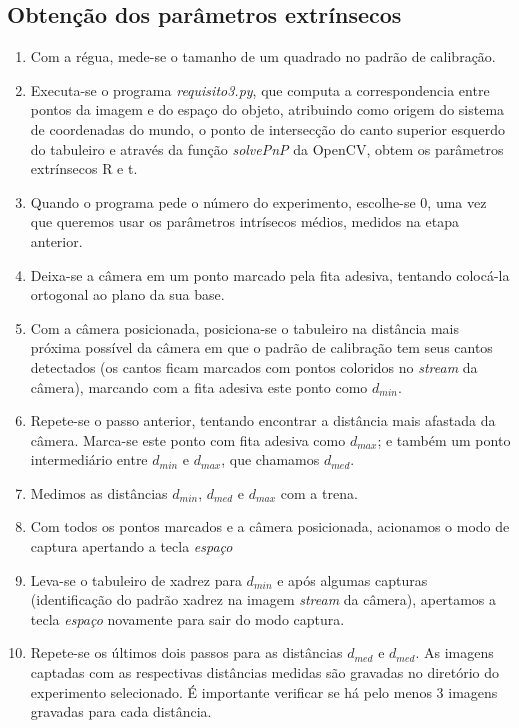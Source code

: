 \documentclass[conference]{IEEEtran}
\begin{document}
\subsection{Obtenção dos parâmetros extrínsecos}\label{extrinsecos}
\begin{enumerate}
\item Com a régua, mede-se o tamanho de um quadrado no padrão de calibração.
\item Executa-se o programa \textit{requisito3.py}, que computa a correspondencia entre pontos da imagem e do espaço do objeto, atribuindo como origem do sistema de coordenadas do mundo, o ponto de intersecção do canto superior esquerdo do tabuleiro e através da função \textit{solvePnP} da OpenCV\cite{OpenCV}, obtem os parâmetros extrínsecos R e t. 
\item Quando o programa pede o número do experimento, escolhe-se \(0\), uma vez que queremos usar os parâmetros intrísecos médios, medidos na etapa anterior.

\item Deixa-se a câmera em um ponto marcado pela fita adesiva, tentando colocá-la ortogonal ao plano da sua base. 
\item Com a câmera posicionada, posiciona-se o tabuleiro na distância mais próxima possível da câmera em que o padrão de calibração tem seus cantos detectados (os cantos ficam marcados com pontos coloridos no \textit{stream} da câmera), marcando com a fita adesiva este ponto como \(d_{min}\). \label{montagem}
\item Repete-se o passo anterior, tentando encontrar a distância mais afastada da câmera. Marca-se este ponto com fita adesiva como \(d_{max}\); e também um ponto intermediário entre \(d_{min}\) e \(d_{max}\), que chamamos \(d_{med}\).
\item Medimos as distâncias \(d_{min}\), \(d_{med}\)  e \(d_{max}\) com a trena.
\item Com todos os pontos marcados e a câmera posicionada, acionamos o modo de captura apertando a tecla \textit{espaço}
\item Leva-se o tabuleiro de xadrez para \(d_{min}\) e após algumas capturas (identificação do padrão xadrez na imagem \textit{stream} da câmera), apertamos a tecla \textit{espaço} novamente para sair do modo captura.\label{medicao}
\item Repete-se os últimos dois passos para as distâncias \(d_{med}\) e \(d_{med}\). As imagens captadas com as respectivas distâncias medidas são gravadas no diretório do experimento selecionado. É importante verificar se há pelo menos 3 imagens gravadas para cada distância.
\end{enumerate}
\end{document}
